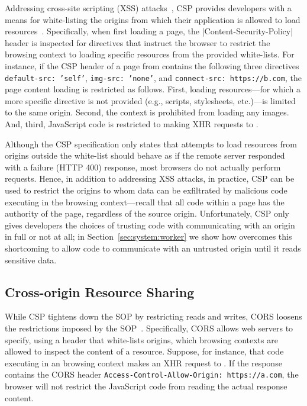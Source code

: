 Addressing cross-site scripting (XSS) attacks~\cite{kerschbaum2007simple}, CSP
provides developers with a means for white-listing the origins from which their
application is allowed to load resources~\cite{csp}.
%
Specifically, when first loading a page, the
\js|Content-Security-Policy| header is inspected for directives that
instruct the browser to restrict the browsing context to loading
specific resources from the provided white-lists.
%
For instance, if the CSP header of a page from  contains
the following three directives
%
\texttt{default-src: 'self'}, \texttt{img-src: 'none'}, and
\texttt{connect-src: https://b.com},
%
the page content loading is restricted as follows.
%
First, loading resources---for which a more specific directive is not
provided (e.g., scripts, stylesheets, etc.)---is limited to the same
origin.
%
Second, the context is prohibited from loading any images.
%
And, third, JavaScript code is restricted to making XHR requests to
.

Although the CSP specification only states that attempts to load
resources from origins outside the white-list should behave as if the
remote server responded with a failure (HTTP 400) response, most
browsers do not actually perform requests.
%
Hence, in addition to addressing XSS attacks, in practice, CSP can
be used to restrict the origins to whom data can be exfiltrated by
malicious code executing in the browsing context---recall that all code
within a page has the authority of the page, regardless of the source
origin.
%
Unfortunately, CSP only gives developers the choices of trusting code
with communicating with an origin in full or not at all;
%
in Section~\ref{sec:system:worker} we show how \sys{} overcomes this
shortcoming to allow code to communicate with an untrusted origin
until it reads sensitive data.


\subsection{Cross-origin Resource Sharing} 
\label{sec:background:cors}

While CSP tightens down the SOP by restricting reads and writes, CORS
loosens the restrictions imposed by the SOP~\cite{rfc6454, VanKesteren2012,
googlehandbook}.
%
Specifically, CORS allows web servers to specify, using a header that
white-lists origins, which browsing contexts are allowed to inspect
the content of a resource.
%
Suppose, for instance, that code executing in an  browsing
context makes an XHR request to .
%
If the response contains the CORS header
\texttt{Access-Control-Allow-Origin: https://a.com}, the browser will
not restrict the JavaScript code from reading the actual response
content.

